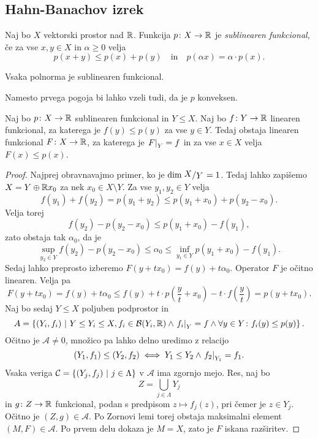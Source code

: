 \newpage

\subsection{Hahn-Banachov izrek}

\begin{definicija}
Naj bo $X$ vektorski prostor nad $\mathbb{R}$. Funkcija $p \colon X \to \mathbb{R}$
je
\emph{sublinearen funkcional},
če za vse $x, y \in X$ in $\alpha \geq 0$ velja
\[
p(x+y) \leq p(x) + p(y)
\quad \text{in} \quad
p(\alpha x) = \alpha \cdot p(x).
\]
\end{definicija}

\begin{opomba}
Vsaka polnorma je sublinearen funkcional.
\end{opomba}

\begin{opomba}
Namesto prvega pogoja bi lahko vzeli tudi, da je $p$ konveksen.
\end{opomba}

\begin{izrek}
\label{iz:hb:1}
Naj bo $p \colon X \to \mathbb{R}$ sublinearen funkcional in $Y \leq X$.
Naj bo $f \colon Y \to \mathbb{R}$ linearen funkcional, za katerega je
$f(y) \leq p(y)$ za vse $y \in Y$. Tedaj obstaja linearen
funkcional $F \colon X \to \mathbb{R}$, za katerega je $\left. F\right|_{Y}^{} = f$
in za vse $x \in X$ velja $F(x) \leq p(x)$.
\end{izrek}

\begin{proof}
Najprej obravnavajmo primer, ko je $\dim \kvoc{X}{Y} = 1$. Tedaj
lahko zapišemo $X = Y \oplus \mathbb{R} x_0$ za nek
$x_0 \in X \setminus Y$. Za vse $y_1, y_2 \in Y$ velja
\[
f(y_1) + f(y_2) = p(y_1 + y_2) \leq p(y_1 + x_0) + p(y_2 - x_0).
\]
Velja torej
\[
f(y_2) - p(y_2 - x_0) \leq p(y_1 + x_0) - f(y_1),
\]
zato obstaja tak $\alpha_0$, da je
\[
\sup_{y_2 \in Y} f(y_2) - p(y_2 - x_0) \leq
\alpha_0 \leq
\inf_{y_1 \in Y} p(y_1 + x_0) - f(y_1).
\]
Sedaj lahko preprosto izberemo $F(y + tx_0) = f(y) + t\alpha_0$.
Operator $F$ je očitno linearen. Velja pa
\[
F(y + tx_0) = f(y) + t\alpha_0 \leq
f(y) + t \cdot p\left(\frac{y}{t} + x_0\right) -
t \cdot f\left(\frac{y}{t}\right) = p(y + t x_0).
\]
Naj bo sedaj $Y \leq X$ poljuben podprostor in
\[
A = \left\{(Y_i, f_i)~\middle\vert~Y \leq Y_i \leq X,
f_i \in \mathcal{B}(Y_i, \mathbb{R}) \land \left. f_i\right|_{Y}^{} = f \land
\forall y \in Y \colon f_i(y) \leq p(y)\right\}.
\]
Očitno je $\mathcal{A} \ne 0$, množico pa lahko delno uredimo z
relacijo
\[
(Y_1, f_1) \leq (Y_2, f_2) \iff
Y_1 \leq Y_2 \land \left. f_2\right|_{Y_1}^{} = f_1.
\]
Vsaka veriga $\mathcal{C} = \left\{(Y_j, f_j)~\middle\vert~j \in \Lambda\right\}$ v
$\mathcal{A}$ ima zgornjo mejo. Res, naj bo
\[
Z = \bigcup_{j \in \Lambda} Y_j
\]
in $g \colon Z \to \mathbb{R}$ funkcional, podan s predpisom
$z \mapsto f_j(z)$, pri čemer je $z \in Y_j$. Očitno je
$(Z, g) \in \mathcal{A}$. Po Zornovi lemi torej obstaja maksimalni
element $(M, F) \in \mathcal{A}$. Po prvem delu dokaza je $M = X$,
zato je $F$ iskana razširitev.
\end{proof}

